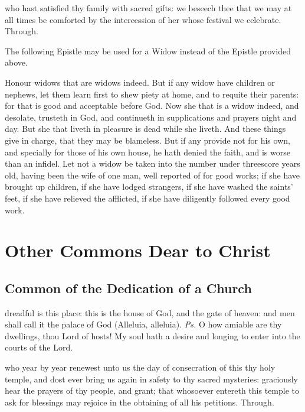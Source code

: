 \postcommunion
{} who hast satisfied thy family with sacred gifts: we beseech thee that we may at all times be comforted by the intercession of her whose festival we celebrate. Through.

\begin{rubric}
	The following Epistle may be used for a Widow instead of the Epistle provided above.
\end{rubric}

\label{1Timothy53}
 Honour widows that are widows indeed. But if any widow have children or nephews, let them learn first to shew piety at home, and to requite their parents: for that is good and acceptable before God. Now she that is a widow indeed, and desolate, trusteth in God, and continueth in supplications and prayers night and day. But she that liveth in pleasure is dead while she liveth. And these things give in charge, that they may be blameless. But if any provide not for his own, and specially for those of his own house, he hath denied the faith, and is worse than an infidel. Let not a widow be taken into the number under threescore years old, having been the wife of one man, well reported of for good works; if she have brought up children, if she have lodged strangers, if she have washed the saints' feet, if she have relieved the afflicted, if she have diligently followed every good work.


\section{Other Commons Dear to Christ}

\subsection{Common of the Dedication of a Church}\label{CommonDedication}

\introit
{} dreadful is this place: this is the house of God, and the gate of heaven: and men shall call it the palace of God (Alleluia, alleluia). \textit{Ps.} O how amiable are thy dwellings, thou Lord of hosts! My soul hath a desire and longing to enter into the courts of the Lord.

\clearpage
\collect
{} who year by year renewest unto us the day of consecration of this thy holy temple, and dost ever bring us again in safety to thy sacred mysteries: graciously hear the prayers of thy people, and grant; that whosoever entereth this temple to ask for blessings may rejoice in the obtaining of all his petitions. Through.

